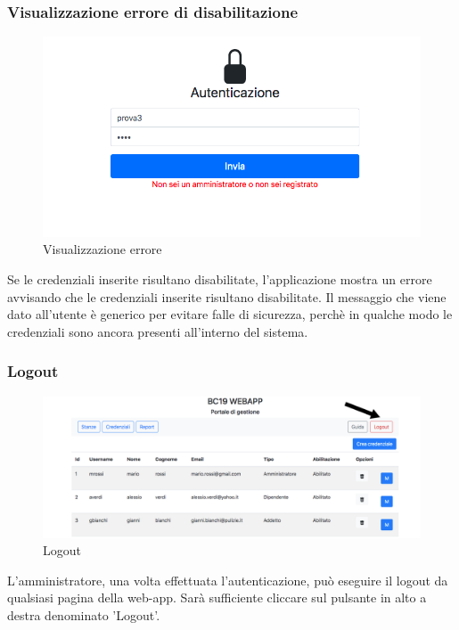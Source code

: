 \subsubsection{Visualizzazione errore di disabilitazione}
\begin{figure}[H]
	\centering
	\includegraphics[width=15cm]{res/images/error.png}
	\caption{Visualizzazione errore}
\end{figure}
Se le credenziali inserite risultano disabilitate, l’applicazione mostra un errore avvisando che le credenziali inserite risultano disabilitate.
Il messaggio che viene dato all'utente è generico per evitare falle di sicurezza, perchè in qualche modo le credenziali sono ancora presenti all'interno del sistema.
\subsubsection{Logout}
\begin{figure}[H]
	\centering
	\includegraphics[width=15cm]{res/images/logout.jpg}
	\caption{Logout}
\end{figure}
L'amministratore, una volta effettuata l'autenticazione, può eseguire il logout da qualsiasi pagina della web-app. Sarà sufficiente cliccare sul pulsante in alto a destra denominato 'Logout'.

